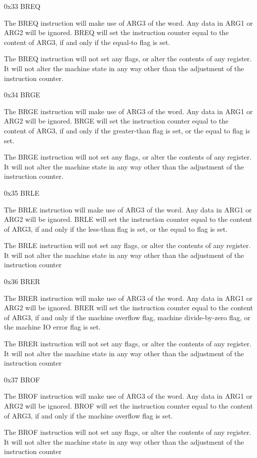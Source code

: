 \documentclass[]{article}
\begin{document}
0x33 BREQ

The BREQ instruction will make use of ARG3 of the word. Any data in ARG1
or ARG2 will be ignored. BREQ will set the instruction counter equal to
the content of ARG3, if and only if the equal-to flag is set.~

The BREQ instruction will not set any flags, or alter the contents of
any register. It will not alter the machine state in any way other than
the adjustment of the instruction counter.

0x34 BRGE

The BRGE instruction will make use of ARG3 of the word. Any data in ARG1
or ARG2 will be ignored. BRGE will set the instruction counter equal to
the content of ARG3, if and only if the greater-than flag is set, or the
equal to flag is set.~

The BRGE instruction will not set any flags, or alter the contents of
any register. It will not alter the machine state in any way other than
the adjustment of the instruction counter.

0x35 BRLE

The BRLE instruction will make use of ARG3 of the word. Any data in ARG1
or ARG2 will be ignored. BRLE will set the instruction counter equal to
the content of ARG3, if and only if the less-than flag is set, or the
equal to flag is set.~

The BRLE instruction will not set any flags, or alter the contents of
any register. It will not alter the machine state in any way other than
the adjustment of the instruction counter

0x36 BRER

The BRER instruction will make use of ARG3 of the word. Any data in ARG1
or ARG2 will be ignored. BRER will set the instruction counter equal to
the content of ARG3, if and only if the machine overflow flag, machine
divide-by-zero flag, or the machine IO error flag is set.

The BRER instruction will not set any flags, or alter the contents of
any register. It will not alter the machine state in any way other than
the adjustment of the instruction counter

0x37 BROF

The BROF instruction will make use of ARG3 of the word. Any data in ARG1
or ARG2 will be ignored. BROF will set the instruction counter equal to
the content of ARG3, if and only if the machine overflow flag is set.~

The BROF instruction will not set any flags, or alter the contents of
any register. It will not alter the machine state in any way other than
the adjustment of the instruction counter
\end{document}
